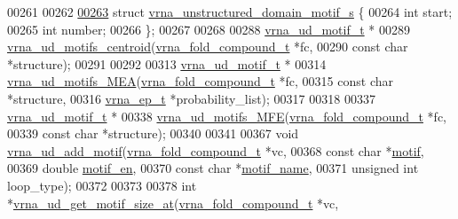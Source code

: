 \begin{DoxyCode}
00261 
00262 
\hyperlink{structvrna__unstructured__domain__motif__s}{00263} \textcolor{keyword}{struct }\hyperlink{structvrna__unstructured__domain__motif__s}{vrna\_unstructured\_domain\_motif\_s} \{
00264   \textcolor{keywordtype}{int} start;
00265   \textcolor{keywordtype}{int} number;
00266 \};
00267 
00268 
00288 \hyperlink{structvrna__unstructured__domain__motif__s}{vrna\_ud\_motif\_t} *
00289 \hyperlink{group__domains__up_ga2039caedf194c5edec794866986d95ec}{vrna\_ud\_motifs\_centroid}(\hyperlink{group__fold__compound_structvrna__fc__s}{vrna\_fold\_compound\_t}  *fc,
00290                         \textcolor{keyword}{const} \textcolor{keywordtype}{char}            *structure);
00291 
00292 
00313 \hyperlink{structvrna__unstructured__domain__motif__s}{vrna\_ud\_motif\_t} *
00314 \hyperlink{group__domains__up_ga980126e9f350b64474b35f20fce2782c}{vrna\_ud\_motifs\_MEA}(\hyperlink{group__fold__compound_structvrna__fc__s}{vrna\_fold\_compound\_t} *fc,
00315                    \textcolor{keyword}{const} \textcolor{keywordtype}{char}           *structure,
00316                    \hyperlink{group__struct__utils__plist_structvrna__elem__prob__s}{vrna\_ep\_t}            *probability\_list);
00317 
00318 
00337 \hyperlink{structvrna__unstructured__domain__motif__s}{vrna\_ud\_motif\_t} *
00338 \hyperlink{group__domains__up_ga464d086264dd6f45089a65acec4e8c21}{vrna\_ud\_motifs\_MFE}(\hyperlink{group__fold__compound_structvrna__fc__s}{vrna\_fold\_compound\_t} *fc,
00339                    \textcolor{keyword}{const} \textcolor{keywordtype}{char}           *structure);
00340 
00341 
00367 \textcolor{keywordtype}{void}  \hyperlink{group__domains__up_ga55f7de5ef5b7472b0eeab9296b57f671}{vrna\_ud\_add\_motif}(\hyperlink{group__fold__compound_structvrna__fc__s}{vrna\_fold\_compound\_t}  *vc,
00368                         \textcolor{keyword}{const} \textcolor{keywordtype}{char}            *\hyperlink{group__domains__up_af285436bbdea4436ad2cedec65d48c75}{motif},
00369                         \textcolor{keywordtype}{double}                \hyperlink{group__domains__up_aae4f0a45419784fb7c244bce2781403d}{motif\_en},
00370                         \textcolor{keyword}{const} \textcolor{keywordtype}{char}            *\hyperlink{group__domains__up_ad061d55ef0b51d304c8dce88ebdbbf78}{motif\_name},
00371                         \textcolor{keywordtype}{unsigned} \textcolor{keywordtype}{int}          loop\_type);
00372 
00373 
00378 \textcolor{keywordtype}{int} *\hyperlink{unstructured__domains_8h_aea51485feeafed1f93222ba7db9fc3b1}{vrna\_ud\_get\_motif\_size\_at}(\hyperlink{group__fold__compound_structvrna__fc__s}{vrna\_fold\_compound\_t} *vc,

\end{DoxyCode}
